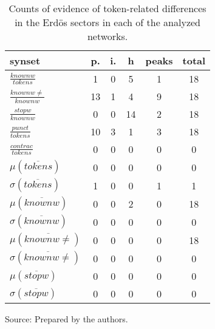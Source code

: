 \begin{table}[h!]
\begin{center}
\caption{Counts of evidence of token-related differences in the Erd\"os sectors in each of the analyzed networks.}
	\def\arraystretch{1.5}
\begin{tabular}{| l || c | c | c || c | c |}\hline
{\bf synset} & {\bf p.} & {\bf i.} & {\bf h} & {\bf peaks} & {\bf total} \\\hline\hline
$\frac{knownw}{tokens}$ & 1  & 0  & 5  & 1  & 18 \\
$\frac{knownw \neq}{knownw}$ & 13  & 1  & 4  & 9  & 18 \\
$\frac{stopw}{knownw}$ & 0  & 0  & 14  & 2  & 18 \\
$\frac{punct}{tokens}$ & 10  & 3  & 1  & 3  & 18 \\
$\frac{contrac}{tokens}$ & 0  & 0  & 0  & 0  & 0 \\\hline
$\mu(\overline{tokens})$ & 0  & 0  & 0  & 0  & 0 \\
$\sigma(\overline{tokens})$ & 1  & 0  & 0  & 1  & 1 \\\hline
$\mu(\overline{knownw})$ & 0  & 0  & 2  & 0  & 18 \\
$\sigma(\overline{knownw})$ & 0  & 0  & 0  & 0  & 0 \\\hline
$\mu(\overline{knownw \neq})$ & 0  & 0  & 0  & 0  & 18 \\
$\sigma(\overline{knownw \neq})$ & 0  & 0  & 0  & 0  & 0 \\\hline
$\mu(\overline{stopw})$ & 0  & 0  & 0  & 0  & 0 \\
$\sigma(\overline{stopw})$ & 0  & 0  & 0  & 0  & 0 \\\hline
\end{tabular}
\begin{flushleft}
		Source: Prepared by the authors.\
\end{flushleft}
\end{center}
\end{table}
